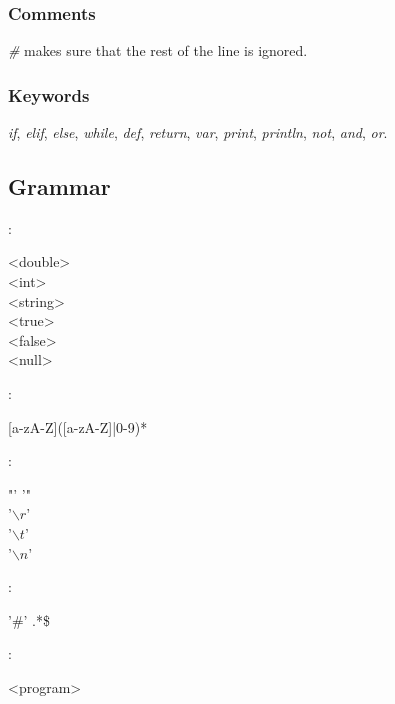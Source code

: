 \documentclass[12pt]{article}
\newcommand{\bs}[2]{%
\begin{minipage}{5in}%
\begin{syntdiag*}[\left{#1}\right{#2}][5in]%
}
\newcommand{\es}{\end{syntdiag*}\end{minipage}}
\begin{document}
\subsubsection{Comments}
\emph{\#} makes sure that the rest of the line is ignored.

\subsubsection{Keywords}
\emph{if}, \emph{elif}, \emph{else}, \emph{while}, \emph{def}, \emph{return}, \emph{var}, \emph{print}, \emph{println}, \emph{not}, \emph{and}, \emph{or}.

\subsection{Grammar}

\begin{framed}
:\\
\indent \bs {>>-} {-><} 
\begin{stack} 
	<double>\\
	<int>\\
	<string>\\
	<true>\\
	<false>\\
	<null> 
\end{stack} 
\es
\end{framed}

\begin{framed}
:\\
\indent \bs {>>-} {-><}
[a-zA-Z]([a-zA-Z]|{0-9})*
\es
\end{framed}

\begin{framed}
: \\
\indent \bs {>>-} {-><}
\begin{stack}
	"' '"\\
	'$\backslash r$' \\
	'$\backslash t$' \\
	'$\backslash n$'
\end{stack}
\es
\end{framed}

\begin{framed}
: \\
\indent \bs {>>-} {-><}
'\#' .*\$
\es
\end{framed}


\begin{framed}
:\\
\indent \bs {>>-} {-><} 
<program>
\es
\end{framed}
\end{document}
